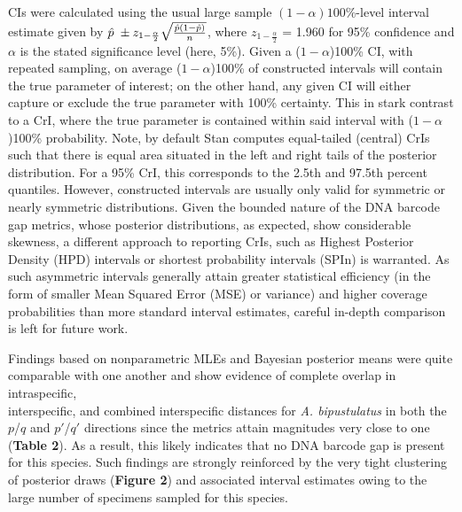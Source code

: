 \documentclass[12pt]{article}
\begin{document}
\noindent  CIs were calculated using the usual large sample  $(1-\alpha)100\%$-level interval estimate given by $\hat{p} \hspace{1mm} \pm z_{1 - \frac{\alpha}{2}}\sqrt{\frac{\hat{p}(1 - \hat{p})}{n}}$, where $z_{1 - \frac{\alpha}{2}}$ = 1.960 for 95\% confidence and $\alpha$ is the stated significance level (here, 5\%). Given a ($1 - \alpha$)100\% CI, with repeated sampling, on average ($1 - \alpha$)100\% of constructed intervals will contain the true parameter of interest; on the other hand, any given CI will either capture or exclude the true parameter with 100\% certainty. This in stark contrast to a CrI, where the true parameter is contained within said interval with ($1 - \alpha$)100\% probability. Note, by default Stan computes equal-tailed (central) CrIs such that there is equal area situated in the left and right tails of the posterior distribution. For a 95\% CrI, this corresponds to the 2.5th and 97.5th percent quantiles. However, constructed intervals are usually only valid for symmetric or nearly symmetric distributions. Given the bounded nature of the DNA barcode gap metrics, whose posterior distributions, as expected, show considerable skewness, a different approach to reporting CrIs, such as Highest Posterior Density (HPD) intervals \citep{chen1999monte} or shortest probability intervals (SPIn) \citep{liu2015simulation} is warranted. As such asymmetric intervals generally attain greater statistical efficiency (in the form of smaller Mean Squared Error (MSE) or variance) and higher coverage probabilities than more standard interval estimates, careful in-depth comparison is left for future work. 

Findings based on nonparametric MLEs and Bayesian posterior means were quite \\ comparable with one another and show evidence of complete overlap in intraspecific, \\ interspecific, and combined interspecific distances for \textit{A. bipustulatus} in both the $p$/$q$ and $p'$/$q'$ directions since the metrics attain magnitudes very close to one (\textbf{Table 2}). As a result, this likely indicates that no DNA barcode gap is present for this species. Such findings are strongly reinforced by the very tight clustering of posterior draws (\textbf{Figure 2}) and associated interval estimates owing to the large number of specimens sampled for this species.
\end{document}
